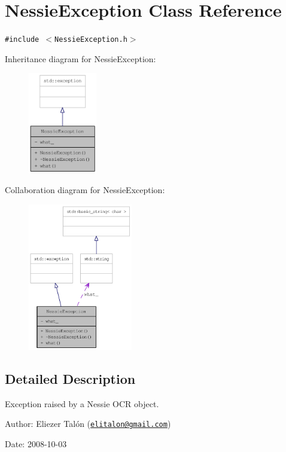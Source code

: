 \hypertarget{class_nessie_exception}{
\section{NessieException Class Reference}
\label{class_nessie_exception}
}
{\tt \#include $<$NessieException.h$>$}

Inheritance diagram for NessieException:\nopagebreak
\begin{figure}[H]
\begin{center}
\leavevmode
\includegraphics[width=85pt]{class_nessie_exception__inherit__graph}
\end{center}
\end{figure}
Collaboration diagram for NessieException:\nopagebreak
\begin{figure}[H]
\begin{center}
\leavevmode
\includegraphics[width=129pt]{class_nessie_exception__coll__graph}
\end{center}
\end{figure}


\subsection{Detailed Description}
Exception raised by a Nessie OCR object. 

\begin{Desc}
\item[Author:]Eliezer Talón (\href{mailto:elitalon@gmail.com}{\tt elitalon@gmail.com}) \end{Desc}
\begin{Desc}
\item[Date:]2008-10-03 \end{Desc}


